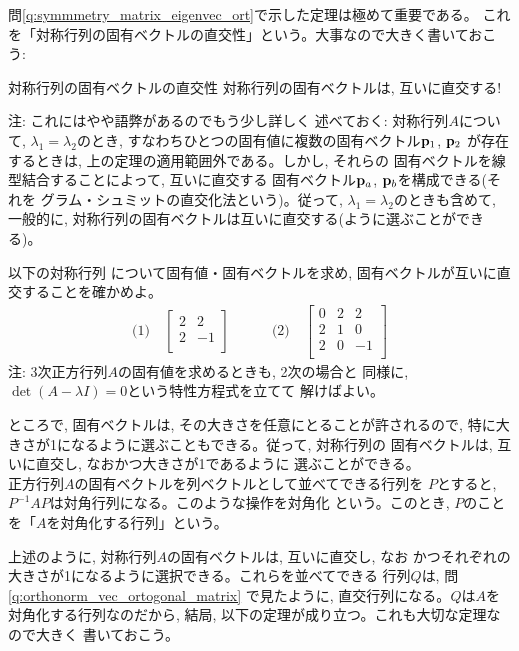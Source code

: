 \begin{q}
問\ref{q:symmmetry_matrix_eigenvec_ort}で示した定理は極めて重要である。
これを「対称行列の固有ベクトルの直交性」という。大事なので大きく書いておこう:

\begin{itembox}{対称行列の固有ベクトルの直交性}
対称行列の固有ベクトルは, 互いに直交する!
\end{itembox}

{\small 注: これにはやや語弊があるのでもう少し詳しく
述べておく: 対称行列$A$について, $\lambda_1=\lambda_2$のとき, 
すなわちひとつの固有値に複数の固有ベクトル${\bf p}_1$, ${\bf p}_2$
が存在するときは, 上の定理の適用範囲外である。しかし, それらの
固有ベクトルを線型結合することによって, 互いに直交する
固有ベクトル${\bf p}_a$, ${\bf p}_b$を構成できる(それを
グラム・シュミットの直交化法という)。従って, 
$\lambda_1=\lambda_2$のときも含めて, 一般的に, 
対称行列の固有ベクトルは互いに直交する(ように選ぶことができる)。}\\

\begin{q}\label{q:symmmetry_matrix_eigenvec_ort_exmpl} 以下の対称行列
について固有値・固有ベクトルを求め, 固有ベクトルが互いに直交することを確かめよ。
\begin{eqnarray*}
\text{(1)}\quad
\left[\begin{array}{cc}
2 & 2\\
2 & -1\\
\end{array}\right]\quad\quad\quad
\text{(2)}\quad
\left[\begin{array}{ccc}
0 & 2 & 2\\
2 & 1 & 0\\
2 & 0 & -1\\
\end{array}\right]\end{eqnarray*}
注: 3次正方行列$A$の固有値を求めるときも, 2次の場合と
同様に, $\det(A-\lambda I)=0$という特性方程式を立てて
解けばよい。
\end{q}

ところで, 固有ベクトルは, その大きさを任意にとることが許されるので, 
特に大きさが1になるように選ぶこともできる。従って, 対称行列の
固有ベクトルは, 互いに直交し, なおかつ大きさが1であるように
選ぶことができる。\\

正方行列$A$の固有ベクトルを列ベクトルとして並べてできる行列を
$P$とすると, $P^{-1}AP$は対角行列になる。このような操作を対角化
という。このとき, $P$のことを「$A$を対角化する行列」という。

上述のように, 対称行列$A$の固有ベクトルは, 互いに直交し, なお
かつそれぞれの大きさが1になるように選択できる。これらを並べてできる
行列$Q$は, 問\ref{q:orthonorm_vec_ortogonal_matrix}
で見たように, 直交行列になる。$Q$は$A$を対角化する行列なのだから, 
結局, 以下の定理が成り立つ。これも大切な定理なので大きく
書いておこう。


\end{q}
